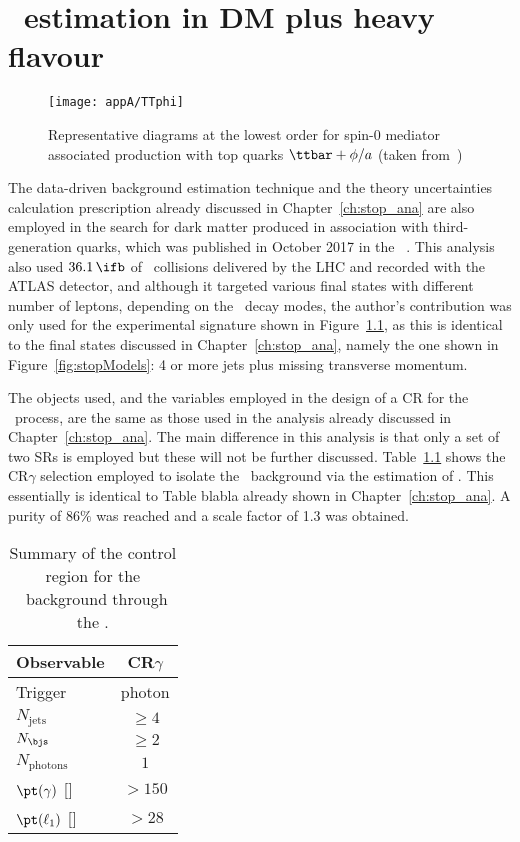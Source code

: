 \chapter{\ttZ\ estimation in DM plus heavy flavour}
\label{ch:appA}

	\begin{wrapfigure}{R}{.33\textwidth}
		\centering\texttt{[image: appA/TTphi]}
		\caption{Representative diagrams at the lowest order for spin-0 mediator associated production with top quarks $\ttbar+\phi/a$ (taken from~\cite{DMhf})}
		\label{fig:dmhfModels}
	\end{wrapfigure}

	The data-driven background estimation technique and the theory uncertainties calculation prescription already discussed in Chapter~\ref{ch:stop_ana} are also employed in the search for dark matter produced in association with third-generation quarks, which was published in October 2017 in the \EPJ~\cite{DMhf}. This analysis also used $36.1\, \ifb$ of \pp\ collisions delivered by the \ac{LHC} and recorded with the \ac{ATLAS} detector, and although it targeted various final states with different number of leptons, depending on the \ttbar\ decay modes, the author's contribution was only used for the experimental signature shown in Figure~\ref{fig:dmhfModels}, as this is identical to the final states discussed in Chapter~\ref{ch:stop_ana}, namely the one shown in Figure~\ref{fig:stopModels}: 4 or more jets plus missing transverse momentum.

	The objects used, and the variables employed in the design of a \ac{CR} for the \ttgamma\ process, are the same as those used in the analysis already discussed in Chapter~\ref{ch:stop_ana}. The main difference in this analysis is that only a set of two \acp{SR} is employed but these will not be further discussed. Table~\ref{tab:CRcuts} shows the CR$\gamma$ selection employed to isolate the \ttZ\ background via the estimation of \ttgamma. This essentially is identical to Table blabla already shown in Chapter~\ref{ch:stop_ana}. A purity of $86\%$ was reached and a scale factor of 1.3 was obtained. 

	\begin{table}
	\centering
	\caption{Summary of the control region for the \ttZ\ background through the \ttgamma.}
	\label{tab:CRcuts}
		\begin{tabular}{lc}
		\toprule
		\textbf{Observable} & CR$\gamma$ \\
		\midrule
		Trigger & photon\\
		$N_{\mathrm{jets}}$ & $\geq 4$ \\ 
		$N_{\bjs}$ & $\geq 2$ \\ \midrule
		$N_{\mathrm{photons}}$ & $1$ \\ 
		$\pt(\gamma)$ [\GeV] & $>150$ \\
		$\pt(\ell_1)$ [\GeV] & $>28$ \\ \bottomrule
		\end{tabular}
	\end{table}

